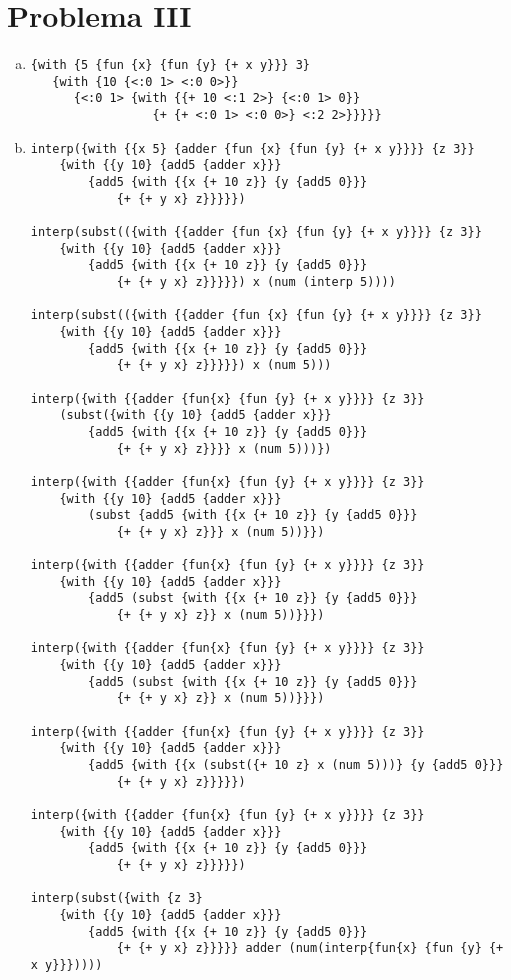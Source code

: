 \documentclass[12pt]{article}
\begin{document}
\section{Problema III}
\begin{enumerate}[a)]
\item
\begin{verbatim}
{with {5 {fun {x} {fun {y} {+ x y}}} 3} 
   {with {10 {<:0 1> <:0 0>}} 
      {<:0 1> {with {{+ 10 <:1 2>} {<:0 1> 0}} 
                 {+ {+ <:0 1> <:0 0>} <:2 2>}}}}}
\end{verbatim}
\item
  \begin{verbatim}
interp({with {{x 5} {adder {fun {x} {fun {y} {+ x y}}}} {z 3}}
    {with {{y 10} {add5 {adder x}}}
        {add5 {with {{x {+ 10 z}} {y {add5 0}}}
            {+ {+ y x} z}}}}})

interp(subst(({with {{adder {fun {x} {fun {y} {+ x y}}}} {z 3}}
    {with {{y 10} {add5 {adder x}}}
        {add5 {with {{x {+ 10 z}} {y {add5 0}}}
            {+ {+ y x} z}}}}}) x (num (interp 5))))

interp(subst(({with {{adder {fun {x} {fun {y} {+ x y}}}} {z 3}}
    {with {{y 10} {add5 {adder x}}}
        {add5 {with {{x {+ 10 z}} {y {add5 0}}}
            {+ {+ y x} z}}}}}) x (num 5)))

interp({with {{adder {fun{x} {fun {y} {+ x y}}}} {z 3}}
    (subst({with {{y 10} {add5 {adder x}}}
        {add5 {with {{x {+ 10 z}} {y {add5 0}}}
            {+ {+ y x} z}}}} x (num 5)))})

interp({with {{adder {fun{x} {fun {y} {+ x y}}}} {z 3}}
    {with {{y 10} {add5 {adder x}}}
        (subst {add5 {with {{x {+ 10 z}} {y {add5 0}}}
            {+ {+ y x} z}}} x (num 5))}})

interp({with {{adder {fun{x} {fun {y} {+ x y}}}} {z 3}}
    {with {{y 10} {add5 {adder x}}}
        {add5 (subst {with {{x {+ 10 z}} {y {add5 0}}}
            {+ {+ y x} z}} x (num 5))}}})

interp({with {{adder {fun{x} {fun {y} {+ x y}}}} {z 3}}
    {with {{y 10} {add5 {adder x}}}
        {add5 (subst {with {{x {+ 10 z}} {y {add5 0}}}
            {+ {+ y x} z}} x (num 5))}}})

interp({with {{adder {fun{x} {fun {y} {+ x y}}}} {z 3}}
    {with {{y 10} {add5 {adder x}}}
        {add5 {with {{x (subst({+ 10 z} x (num 5)))} {y {add5 0}}}
            {+ {+ y x} z}}}}})

interp({with {{adder {fun{x} {fun {y} {+ x y}}}} {z 3}}
    {with {{y 10} {add5 {adder x}}}
        {add5 {with {{x {+ 10 z}} {y {add5 0}}}
            {+ {+ y x} z}}}}})

interp(subst({with {z 3}
    {with {{y 10} {add5 {adder x}}}
        {add5 {with {{x {+ 10 z}} {y {add5 0}}}
            {+ {+ y x} z}}}}} adder (num(interp{fun{x} {fun {y} {+ x y}}}))))
\end{verbatim}
  
\end{enumerate}
\end{document}
